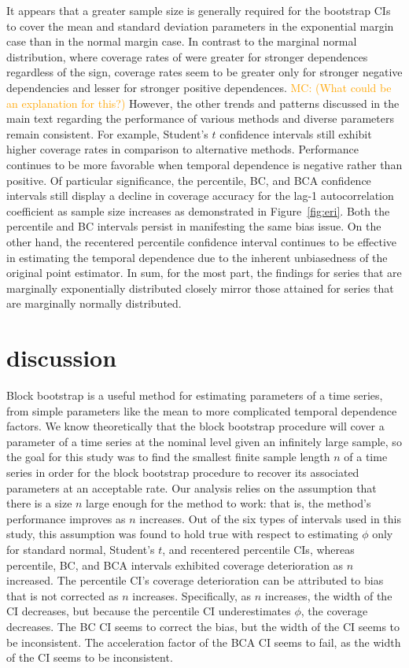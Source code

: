 \documentclass[10pt]{article}
\newcommand{\mc}[1]{\textcolor{orange}{MC: (#1)}}
\begin{document}
It appears that a greater sample size is generally required for the bootstrap
CIs to cover the mean and standard deviation parameters in the exponential
margin case than in the normal margin case. In contrast to the marginal normal
distribution, where coverage rates of were greater for stronger dependences 
regardless of the sign, coverage rates seem to be greater only for stronger 
negative
dependencies and lesser for stronger positive dependences. 
\mc{What could be an explanation for this?}
However, the other 
trends 
and patterns
discussed in the main text regarding the performance of various methods and
diverse parameters remain consistent. For example, Student's $t$ confidence
intervals still exhibit higher coverage rates in comparison to alternative
methods. Performance continues to be more favorable when temporal dependence is
negative rather than positive. Of particular significance, the 
percentile, BC,
and BCA confidence intervals still display a decline in coverage accuracy for
the lag-1 autocorrelation coefficient as sample size increases as demonstrated
in Figure~\ref{fig:eri}. Both the percentile and BC intervals persist in
manifesting the same bias issue. On the other hand, the recentered percentile
confidence interval continues to be effective in estimating the temporal 
dependence 
due to the
inherent unbiasedness of the original point estimator. In sum, 
for the most part, the findings for
series that are marginally exponentially distributed closely mirror those
attained for series that are marginally normally distributed.
  
\section*{discussion}
\label{sec:disc}

Block bootstrap is a useful method for estimating parameters of a time series,
from simple parameters like the mean to more complicated temporal dependence
factors. We know theoretically that the block bootstrap procedure will cover a 
parameter of a time series at the nominal level given an infinitely large 
sample, \citep{calhoun2018} so the goal for this study was to find the smallest 
finite sample length 
$n$ of a time series in order for the block bootstrap procedure to recover its 
associated parameters at an acceptable rate. Our analysis relies on the 
assumption that there is a size $n$ large enough for the method to work: that 
is, the method's performance improves as $n$ increases. Out of the six types of 
intervals used in this study, this assumption was found to hold true with 
respect to estimating $\phi$ only for standard normal, Student's $t$, and recentered 
percentile CIs, whereas percentile, BC, and BCA intervals exhibited coverage 
deterioration as $n$ increased. The percentile CI's coverage deterioration can 
be attributed to bias that is not corrected as $n$ increases. Specifically, as 
$n$ increases, the width of the CI decreases, but because the percentile CI 
underestimates $\phi$, the coverage decreases. The BC CI seems to correct the 
bias, but the width of the CI seems to be inconsistent. The acceleration factor 
of the BCA CI seems to fail, as the width of the CI seems to be inconsistent. 
\end{document}
